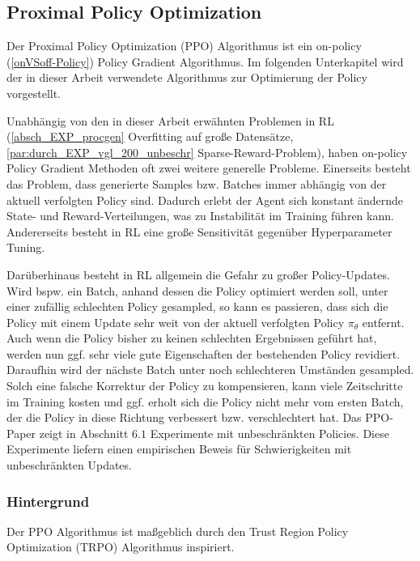 



\subsection{Proximal Policy Optimization}\label{absch_RL_ppo}
Der Proximal Policy Optimization (PPO) \cite{schulman2017proximal} Algorithmus ist ein on-policy (\ref{onVSoff-Policy}) Policy Gradient Algorithmus. Im folgenden Unterkapitel wird der in dieser Arbeit verwendete Algorithmus zur Optimierung der Policy vorgestellt. 

Unabhängig von den in dieser Arbeit erwähnten Problemen in RL (\ref{absch_EXP_procgen} Overfitting auf große Datensätze, \ref{par:durch_EXP_vgl_200_unbeschr} Sparse-Reward-Problem), haben on-policy Policy Gradient Methoden oft zwei weitere generelle Probleme. Einerseits besteht das Problem, dass generierte Samples bzw. Batches immer abhängig von der aktuell verfolgten Policy sind. Dadurch erlebt der Agent sich konstant ändernde State- und Reward-Verteilungen, was zu Instabilität im Training führen kann.
Andererseits besteht in RL eine große Sensitivität gegenüber Hyperparameter Tuning. 

Darüberhinaus besteht in RL allgemein die Gefahr zu großer Policy-Updates. Wird bspw. ein Batch, anhand dessen die Policy optimiert werden soll, unter einer zufällig schlechten Policy gesampled, so kann es passieren, dass sich die Policy mit einem Update sehr weit von der aktuell verfolgten Policy $ \pi_{\theta} $ entfernt. Auch wenn die Policy bisher zu keinen schlechten Ergebnissen geführt hat, werden nun ggf. sehr viele gute Eigenschaften der bestehenden Policy revidiert. Daraufhin wird der nächste Batch unter noch schlechteren Umständen gesampled. Solch eine falsche Korrektur der Policy zu kompensieren, kann viele Zeitschritte im Training kosten und ggf. erholt sich die Policy nicht mehr vom ersten Batch, der die Policy in diese Richtung verbessert bzw. verschlechtert hat. Das PPO-Paper \cite{schulman2017proximal} zeigt in Abschnitt $6.1$ Experimente mit unbeschränkten Policies. Diese Experimente liefern einen empirischen Beweis für Schwierigkeiten mit unbeschränkten Updates.

\subsubsection{Hintergrund}\label{absch_RL_PPO_hintergrund}
Der PPO Algorithmus ist maßgeblich durch den Trust Region Policy Optimization (TRPO) Algorithmus \cite{schulman2015trust} inspiriert. 

